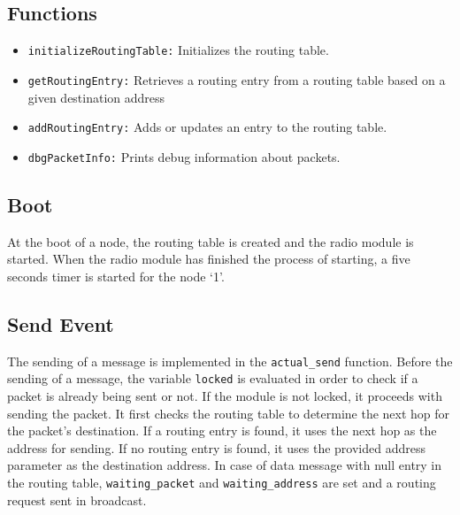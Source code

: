 \documentclass[11pt]{article}
\begin{document}
\subsection*{Functions}
\begin{itemize}
	\item{\texttt{initializeRoutingTable:}} Initializes the routing table.
	\item{\texttt{getRoutingEntry:}} Retrieves a routing entry from a routing table based on a given destination address
	\item{\texttt{addRoutingEntry:}} Adds or updates an entry to the routing table. 
	\item{\texttt{dbgPacketInfo:}} Prints debug information about packets.
\end{itemize}
\subsection*{Boot}
At the boot of a node, the routing table is created and the radio module is started. When the radio module has finished the process of starting, a five seconds timer is started for the node `1'.
\subsection*{Send Event}
The sending of a message is implemented in the 	\texttt{actual\_send} function.
Before the sending of a message, the variable \texttt{locked} is evaluated in order to check if a packet is already being sent or not.
If the module is not locked, it proceeds with sending the packet. It first checks the routing table to determine the next hop for the packet's destination. If a routing entry is found, it uses the next hop as the address for sending. If no routing entry is found, it uses the provided address parameter as the destination address.
In case of data message with null entry in the routing table, \texttt{waiting\_packet} and \texttt{waiting\_address} are set and a routing request sent in broadcast.
\end{document}
